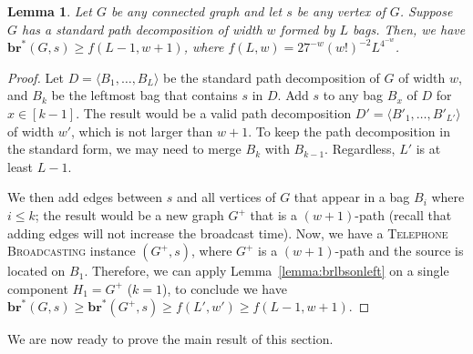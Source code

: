 \documentclass[letterpaper,11pt]{article}
\newtheorem{lemma}[theorem]{Lemma}
\newcommand{\bropt}{{\boldsymbol{br}^*}}
\newcommand{\bigell}{L}
\newcommand{\telebr}{\textsc{Telephone Broadcasting}\xspace}
\newcommand{\pwidth}{w}
\begin{document}
\begin{lemma}
\label{lemma:pwidth-ell}
   Let $G$ be any connected graph 
   and 
   let $s$ be any vertex of $G$. Suppose $G$ has a standard path decomposition of width $\pwidth$ formed by $\bigell$ bags. Then, we have $\bropt(G,s) \geq f(\bigell-1,\pwidth+1)$, where $f(\bigell, \pwidth) = 27^{-\pwidth}(\pwidth!)^{-2}\bigell^{4^{-\pwidth}}$.
\end{lemma}
\begin{proof}
Let $D = \langle B_1,\ldots, B_\bigell\rangle$ be the standard path decomposition of $G$ of width $\pwidth$, and $B_k$ be the leftmost bag that contains $s$ in $D$.
Add $s$ to any bag $B_x$ of $D$ for $x\in[k-1]$. The result would be a valid path decomposition $D'=\langle B'_1,\ldots, B'_{\bigell'}\rangle$ of width $\pwidth'$, which is not larger than $\pwidth+1$. To keep the path decomposition in the standard form, we may need to merge $B_k$ with $B_{k-1}$. 
Regardless, $\bigell'$ is at least $\bigell-1$. 

We then add edges between $s$ and all vertices of $G$ that appear in a bag $B_i$ where $i\leq k$; the result would be a new graph $G^+$ that is a $(\pwidth+1)$-path (recall that adding edges will not increase the broadcast time). Now, we have a \telebr instance $(G^+,s)$, where $G^+$ is a $(\pwidth+1)$-path and the source is located on $B_1$. Therefore, we can apply   
Lemma~\ref{lemma:brlbsonleft} on a single component $H_1=G^+$ ($k=1$), to conclude we have $\bropt(G,s) \geq \bropt(G^+,s) \geq f(\bigell',\pwidth')\geq f(\bigell-1,\pwidth+1)$. \end{proof}

We are now ready to prove the main result of this section.
\end{document}
